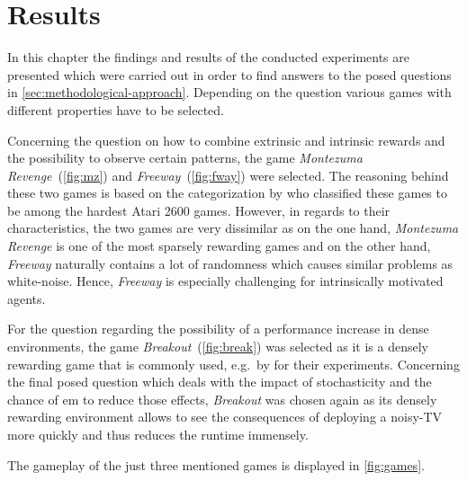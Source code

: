 \documentclass[draft,final]{vutinfth} %
\newcommand{\pautoref}[1]{(\autoref{#1})}
\begin{document}
    \glsresetall


    \chapter{Results}\label{ch:results}

    In this chapter the findings and results of the conducted experiments are presented which were carried out in order to find answers to the posed questions in \autoref{sec:methodological-approach}.
    Depending on the question various games with different properties have to be selected.

    Concerning the question on how to combine extrinsic and intrinsic rewards and the possibility to observe certain patterns, the game \textit{Montezuma Revenge}~\pautoref{fig:mz} and \textit{Freeway}~\pautoref{fig:fway} were selected.
    The reasoning behind these two games is based on the categorization by \citeauthor{bellemare_unifying_2016} who classified these games to be among the hardest Atari 2600 games.
    However, in regards to their characteristics, the two games are very dissimilar as on the one hand, \textit{Montezuma Revenge} is one of the most sparsely rewarding games and on the other hand, \textit{Freeway} naturally contains a lot of randomness which causes similar problems as white-noise.
    Hence, \textit{Freeway} is especially challenging for intrinsically motivated agents.

    For the question regarding the possibility of a performance increase in dense environments, the game \textit{Breakout}~\pautoref{fig:break} was selected as it is a densely rewarding game that is commonly used, e.g.\ by \citet{burda_large-scale_2018-1} for their experiments.
    Concerning the final posed question which deals with the impact of stochasticity and the chance of \gls{em} to reduce those effects, \textit{Breakout} was chosen again as its densely rewarding environment allows to see the consequences of deploying a noisy-TV more quickly and thus reduces the runtime immensely.

    The gameplay of the just three mentioned games is displayed in \autoref{fig:games}.
\end{document}
